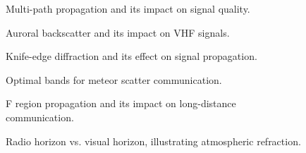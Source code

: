 \begin{figure}[h]
    \centering
    \caption{Multi-path propagation and its impact on signal quality.}
    \label{fig:multi-path}
\end{figure}

\begin{figure}[h]
    \centering
    \caption{Auroral backscatter and its impact on VHF signals.}
    \label{fig:auroral-backscatter}
\end{figure}

\begin{figure}[h]
    \centering
    \caption{Knife-edge diffraction and its effect on signal propagation.}
    \label{fig:knife-edge-diffraction}
\end{figure}

\begin{figure}[h]
    \centering
    \caption{Optimal bands for meteor scatter communication.}
    \label{fig:meteor-scatter-bands}
\end{figure}

\begin{figure}[h]
    \centering
    \caption{F region propagation and its impact on long-distance communication.}
    \label{fig:f-region-propagation}
\end{figure}

\begin{figure}[h]
    \centering
    \caption{Radio horizon vs. visual horizon, illustrating atmospheric refraction.}
    \label{fig:radio-horizon}
\end{figure}

